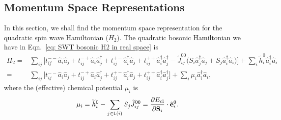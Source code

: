 \subsection{Momentum Space Representations}

In this section, we shall find the momentum space representation for the quadratic spin wave Hamiltonian ($H_{2}$).
The quadratic bosonic Hamiltonian we have in Eqn.~\eqref{eq: SWT bosonic H2 in real space} is 
\begin{equation}
    \begin{split}
        H_{2} = & \sum_{ij}
        \Big[ t_{ij}^{--} \hat{a}_{i} \hat{a}_{j} + t_{ij}^{-+} \hat{a}_{i}\hat{a}_{j}^{\dagger} + t_{ij}^{+-} \hat{a}_{i}^{\dagger} \hat{a}_{j} + t_{ij}^{++} \hat{a}^{\dagger}_{i} \hat{a}^{\dagger}_{j} - \widetilde{J}_{ij}^{00} \big( S_{i} \hat{a}_{j}^{\dagger} \hat{a}_{j} + S_{j} \hat{a}_{i}^{\dagger} \hat{a}_{i} \big) \Big]  + \sum_{i} \widetilde{h}^{0}_{i} \hat{a}^{\dagger}_{i}\hat{a}_{i} \\
        = & \sum_{ij} 
        \Big[ t_{ij}^{--} \hat{a}_{i} \hat{a}_{j} + t_{ij}^{-+} \hat{a}_{i}\hat{a}_{j}^{\dagger} + t_{ij}^{+-} \hat{a}_{i}^{\dagger} \hat{a}_{j} + t_{ij}^{++} \hat{a}^{\dagger}_{i} \hat{a}^{\dagger}_{j} \Big] 
        + \sum_{i} \mu_{i} \hat{a}^{\dagger}_{i} \hat{a}_{i}, 
    \end{split}
\end{equation}
where the (effective) chemical potential $\mu_{i}$ is 
\begin{equation}
    \mu_{i} = \widetilde{h}^{0}_{i} - \sum_{j \in \mathsf{L}(i)} S_{j} \widetilde{J}^{00}_{ij} = \frac{\partial E_{\rm cl}}{\partial \mathbf{S}_{i}} \cdot \hat{\mathbf{e}}_{i}^{0}.
\end{equation}

